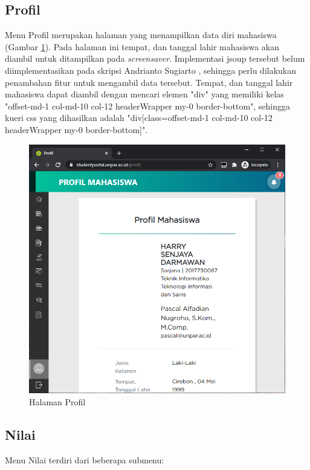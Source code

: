 \subsection{Profil}
    Menu Profil merupakan halaman yang menampilkan data diri mahasiswa (Gambar \ref{fig:3_profil}). Pada halaman ini tempat, dan tanggal lahir mahasiswa akan diambil untuk ditampilkan pada \textit{screensaver}. Implementasi jsoup tersebut belum diimplementasikan pada skripsi Andrianto Sugiarto \cite{ifstupor}, sehingga perlu dilakukan penambahan fitur untuk mengambil data tersebut. Tempat, dan tanggal lahir mahasiswa dapat diambil dengan mencari elemen "div" yang memiliki kelas "offset-md-1 col-md-10 col-12 headerWrapper my-0 border-bottom", sehingga kueri css yang dihasilkan adalah "div[class=offset-md-1 col-md-10 col-12 headerWrapper my-0 border-bottom]".
    \begin{figure}[H]
    	\centering
    	\includegraphics[scale=0.45]{Gambar/profil.png}
    	\caption{Halaman Profil} 
    	\label{fig:3_profil}
    \end{figure}
    
\subsection{Nilai}
    Menu Nilai terdiri dari beberapa submenu:
    
